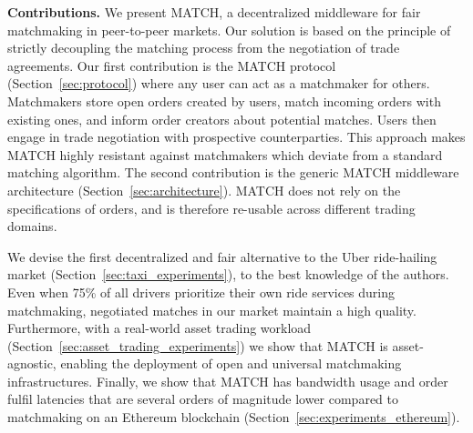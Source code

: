 \textbf{Contributions.}
We present MATCH, a decentralized middleware for fair matchmaking in peer-to-peer markets.
Our solution is based on the principle of strictly decoupling the matching process from the negotiation of trade agreements.
Our first contribution is the MATCH protocol (Section~\ref{sec:protocol}) where any user can act as a matchmaker for others.
Matchmakers store open orders created by users, match incoming orders with existing ones, and inform order creators about potential matches.
Users then engage in trade negotiation with prospective counterparties.
This approach makes MATCH highly resistant against matchmakers which deviate from a standard matching algorithm. 
The second contribution is the generic MATCH middleware architecture (Section~\ref{sec:architecture}).
MATCH does not rely on the specifications of orders, and is therefore re-usable across different trading domains.

We devise the first decentralized and fair alternative to the Uber ride-hailing market (Section~\ref{sec:taxi_experiments}), to the best knowledge of the authors.
Even when 75\% of all drivers prioritize their own ride services during matchmaking, negotiated matches in our market maintain a high quality.
Furthermore, with a real-world asset trading workload (Section~\ref{sec:asset_trading_experiments}) we show that MATCH is asset-agnostic, enabling the deployment of open and universal matchmaking infrastructures.
Finally, we show that MATCH has bandwidth usage and order fulfil latencies that are several orders of magnitude lower compared to matchmaking on an Ethereum blockchain (Section~\ref{sec:experiments_ethereum}). 

